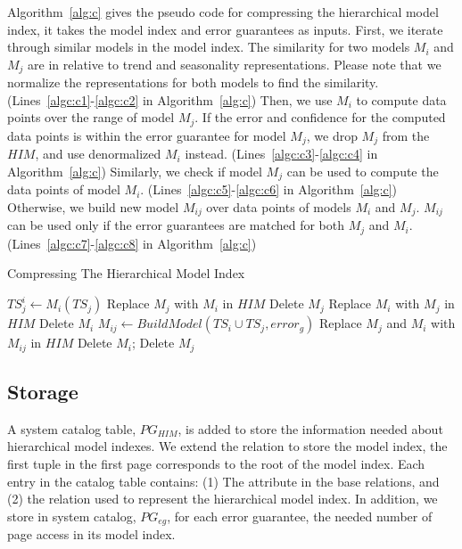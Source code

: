 \documentclass[10pt,conference,letterpaper]{IEEEtran}
\begin{document}
Algorithm~\ref{alg:c} gives the pseudo code for compressing the hierarchical model index, it takes the model index and error guarantees as inputs.
First, we iterate through similar models in the model index. The similarity for two models $M_i$ and $M_j$ are  in relative to trend and seasonality representations. Please note that we normalize the representations for both models to find the similarity. (Lines~\ref{algc:c1}-\ref{algc:c2} in Algorithm~\ref{alg:c}) Then, we use $M_i$ to compute data points over the range of model $M_j$. If the error and confidence for the computed data points is within the error guarantee for model $M_j$, we drop $M_j$ from the $HIM$, and use denormalized $M_i$ instead. (Lines~\ref{algc:c3}-\ref{algc:c4} in Algorithm~\ref{alg:c}) Similarly, we check if model $M_j$ can be used to compute the data points of model $M_i$. (Lines~\ref{algc:c5}-\ref{algc:c6} in Algorithm~\ref{alg:c}) Otherwise, we build new model $M_{ij}$ over data points of models $M_i$ and $M_j$. $M_{ij}$ can be used only if the error guarantees are matched for both $M_j$ and $M_i$. (Lines~\ref{algc:c7}-\ref{algc:c8} in Algorithm~\ref{alg:c})
\begin{algorithm}[tp]
\caption{Compressing The Hierarchical Model Index}
\label{alg:c}
\begin{algorithmic}[1]
 \label{algc:c1}
\State $TS^i_j \gets  M_i(TS_j)$ \label{algc:c2}
 \label{algc:c3}
\State Replace $M_j$ with $M_i$ in $HIM$ 
\State Delete $M_j$ \label{algc:c4}
 \label{algc:c5}
\State Replace $M_i$ with $M_j$ in $HIM$
\State Delete $M_i$ \label{algc:c6}
\Else 
\State $M_{ij} \gets BuildModel(TS_i \cup TS_j, error_g)$ \label{algc:c7}
\State Replace $M_j$ and $M_i$ with $M_{ij}$ in $HIM$
\State Delete $M_i$; Delete $M_j$ \label{algc:c8}
\EndIf
\EndIf
\EndFor
\EndProcedure
\end{algorithmic}
\end{algorithm}



\subsection{Storage}
 A system catalog table, $PG_{HIM}$, is added to store the information needed about hierarchical model indexes. We extend the relation  to store the  model index, the first tuple in the first page corresponds to the root of the model index. Each entry in the catalog table contains: (1) The attribute in the base relations, and (2) the relation used to represent the hierarchical model index. In addition, we store in system catalog, $PG_{eg}$,  for each error guarantee, the needed number of page access in its model index.
 
\end{document}
